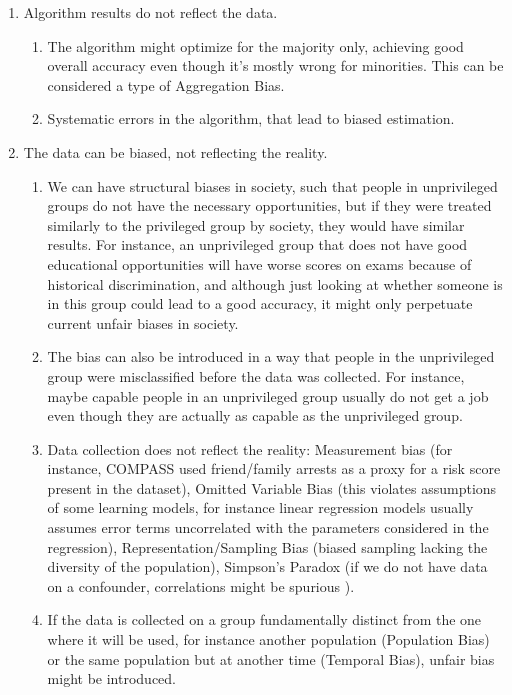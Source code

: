 \documentclass[conference]{IEEEtran}
\begin{document}
\begin{enumerate}
\item Algorithm results do not reflect the data.
    \begin{enumerate}
    \item The algorithm might optimize for the majority only, achieving good overall accuracy even though it's mostly wrong for minorities. This can be considered a type of Aggregation Bias.
    \item Systematic errors in the algorithm, that lead to biased estimation.
    \end{enumerate}
\item The data can be biased, not reflecting the reality.
    \begin{enumerate}
    \item We can have structural biases in society, such that people in unprivileged groups do not have the necessary opportunities, but if they were treated similarly to the privileged group by society, they would have similar results. For instance, an unprivileged group that does not have good educational opportunities will have worse scores on exams because of historical discrimination, and although just looking at whether someone is in this group could lead to a good accuracy, it might only perpetuate current unfair biases in society.
    \item The bias can also be introduced in a way that people in the unprivileged group were misclassified before the data was collected. For instance, maybe capable people in an unprivileged group usually do not get a job even though they are actually as capable as the unprivileged group.
    \item Data collection does not reflect the reality: Measurement bias (for instance, COMPASS used friend/family arrests as a proxy for a risk score present in the dataset), Omitted Variable Bias (this violates assumptions of some learning models, for instance linear regression models usually assumes error terms uncorrelated with the parameters considered in the regression), Representation/Sampling Bias (biased sampling lacking the diversity of the population), Simpson's Paradox (if we do not have data on a confounder, correlations might be spurious \cite{Causality}).
    \item If the data is collected on a group fundamentally distinct from the one where it will be used, for instance another population (Population Bias) or the same population but at another time (Temporal Bias), unfair bias might be introduced.

\end{enumerate}
\end{enumerate}
\end{document}
